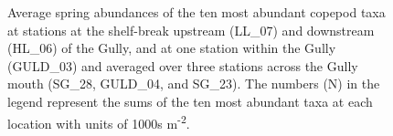 \documentclass[12pt]{article}\usepackage[]{graphicx}\usepackage[]{color}
\begin{document}
\begin{figure}[htb]

{\centering {} 

}

\caption{Average spring abundances of the ten most abundant copepod taxa at stations at the shelf-break upstream (LL\_07) and downstream (HL\_06) of the Gully, and at one station within the Gully (GULD\_03) and averaged over three stations across the Gully mouth (SG\_28, GULD\_04, and SG\_23). The numbers (N) in the legend represent the sums of the ten most abundant taxa at each location with units of 1000s m\textsuperscript{-2}.}\label{fig:figure31}
\end{figure}
\clearpage
\end{document}
